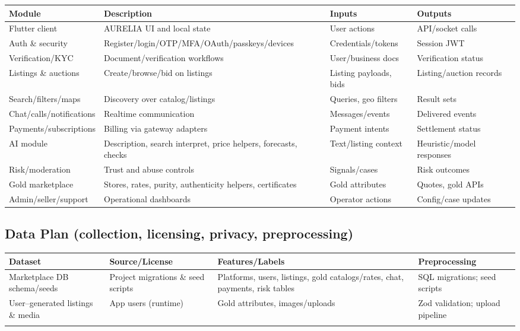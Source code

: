 \documentclass[11pt,a4paper]{article}
\begin{document}
\begin{tabularx}{\textwidth}{@{}
  >{\raggedright\arraybackslash}p{2.6cm}
  >{\raggedright\arraybackslash}X
  >{\raggedright\arraybackslash}p{2.8cm}
  >{\raggedright\arraybackslash}p{2.8cm}@{}}
\toprule
\textbf{Module} & \textbf{Description} & \textbf{Inputs} & \textbf{Outputs} \\
\midrule
Flutter client & AURELIA UI and local state & User actions & API/socket calls \\
Auth \& security & Register/login/OTP/MFA/OAuth/passkeys/devices & Credentials/tokens & Session JWT \\
Verification/KYC & Document/verification workflows & User/business docs & Verification status \\
Listings \& auctions & Create/browse/bid on listings & Listing payloads, bids & Listing/auction records \\
Search/filters/maps & Discovery over catalog/listings & Queries, geo filters & Result sets \\
Chat/calls/notifications & Realtime communication & Messages/events & Delivered events \\
Payments/subscriptions & Billing via gateway adapters & Payment intents & Settlement status \\
AI module & Description, search interpret, price helpers, forecasts, checks & Text/listing context & Heuristic/model responses \\
Risk/moderation & Trust and abuse controls & Signals/cases & Risk outcomes \\
Gold marketplace & Stores, rates, purity, authenticity helpers, certificates & Gold attributes & Quotes, gold APIs \\
Admin/seller/support & Operational dashboards & Operator actions & Config/case updates \\
\bottomrule
\end{tabularx}

\subsection{Data Plan (collection, licensing, privacy, preprocessing)}

\begin{tabularx}{\textwidth}{@{}*{4}{>{\raggedright\arraybackslash}X}@{}}
\toprule
\textbf{Dataset} & \textbf{Source/License} & \textbf{Features/Labels} & \textbf{Preprocessing} \\
\midrule
Marketplace DB schema/seeds & Project migrations \& seed scripts & Platforms, users, listings, gold catalogs/rates, chat, payments, risk tables & SQL migrations; seed scripts \\
User--generated listings \& media & App users (runtime) & Gold attributes, images/uploads & Zod validation; upload pipeline \\
 &  &  &  \\
\bottomrule
\end{tabularx}
\end{document}
